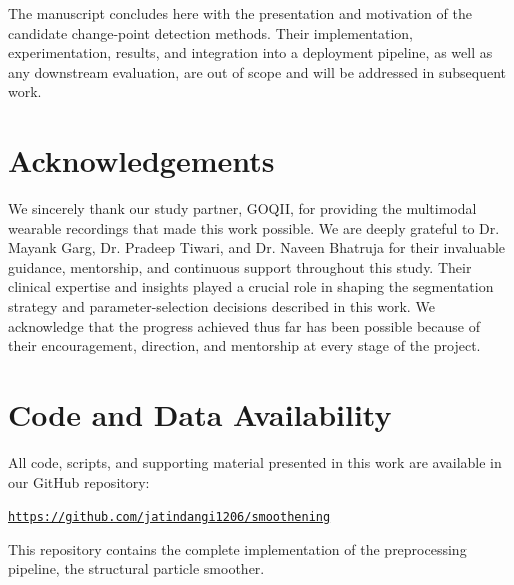 \documentclass[11pt, a4paper]{article}
\theoremstyle{plain}
\theoremstyle{definition}
\begin{document}
The manuscript concludes here with the presentation and motivation of the
candidate change-point detection methods. Their implementation,
experimentation, results, and integration into a deployment pipeline, as
well as any downstream evaluation, are out of scope and will be addressed in
subsequent work.

\section*{Acknowledgements}
We sincerely thank our study partner, GOQII, for providing the multimodal wearable recordings that made this work possible. We are deeply grateful to Dr. Mayank Garg, Dr. Pradeep Tiwari, and Dr. Naveen Bhatruja for their invaluable guidance, mentorship, and continuous support throughout this study. Their clinical expertise and insights played a crucial role in shaping the segmentation strategy and parameter-selection decisions described in this work. We acknowledge that the progress achieved thus far has been possible because of their encouragement, direction, and mentorship at every stage of the project.

\section*{Code and Data Availability}
All code, scripts, and supporting material presented in this work are
available in our GitHub repository:

\medskip
\noindent\href{https://github.com/jatindangi1206/smoothening}{\texttt{https://github.com/jatindangi1206/smoothening}}
\medskip

\noindent This repository contains the complete implementation of the
preprocessing pipeline, the structural particle smoother.\\

\end{document}

